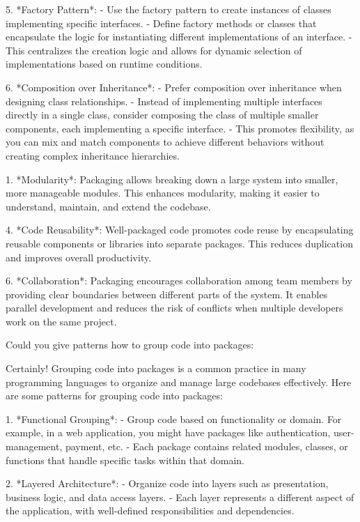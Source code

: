 5. *Factory Pattern*:
- Use the factory pattern to create instances of classes implementing specific interfaces.
- Define factory methods or classes that encapsulate the logic for instantiating different implementations of an interface.
- This centralizes the creation logic and allows for dynamic selection of implementations based on runtime conditions.

6. *Composition over Inheritance*:
- Prefer composition over inheritance when designing class relationships.
- Instead of implementing multiple interfaces directly in a single class, consider composing the class of multiple smaller components, each implementing a specific interface.
- This promotes flexibility, as you can mix and match components to achieve different behaviors without creating complex inheritance hierarchies.

1. *Modularity*: Packaging allows breaking down a large system into smaller, more manageable modules. This enhances modularity, making it easier to understand, maintain, and extend the codebase.



4. *Code Reusability*: Well-packaged code promotes code reuse by encapsulating reusable components or libraries into separate packages. This reduces duplication and improves overall productivity.

6. *Collaboration*: Packaging encourages collaboration among team members by providing clear boundaries between different parts of the system. It enables parallel development and reduces the risk of conflicts when multiple developers work on the same project.





Could you give patterns how to group code into packages:

Certainly! Grouping code into packages is a common practice in many programming languages to organize and manage large codebases effectively. Here are some patterns for grouping code into packages:

1. *Functional Grouping*:
- Group code based on functionality or domain. For example, in a web application, you might have packages like authentication, user-management, payment, etc.
- Each package contains related modules, classes, or functions that handle specific tasks within that domain.

2. *Layered Architecture*:
- Organize code into layers such as presentation, business logic, and data access layers.
- Each layer represents a different aspect of the application, with well-defined responsibilities and dependencies.

